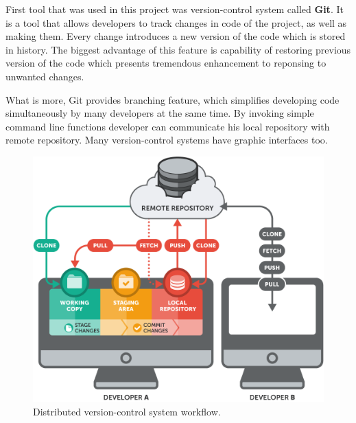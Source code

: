 \documentclass[a4paper,12pt]{book}
\newcommand\tab[1][1cm]{\hspace*{#1}}
\begin{document}
{
\tab First tool that was used in this project was version-control system called \textbf{Git}. It is a tool that allows developers to track changes in code of the project, as well as making them. Every change introduces a new version of the code which is stored in history. The biggest advantage of this feature is capability of restoring previous version of the code which presents tremendous enhancement to reponsing to unwanted changes.

\bigskip
What is more, Git provides branching feature, which simplifies developing code simultaneously by many developers at the same time. By invoking simple command line functions developer can communicate his local repository with remote repository. Many version-control systems have graphic interfaces too.

\bigskip
\begin{figure}[H]
  \centering
    \includegraphics[width=1.0\textwidth]{git}
    \caption{Distributed version-control system workflow.~\cite{git}}
\end{figure}   
}
\end{document}
